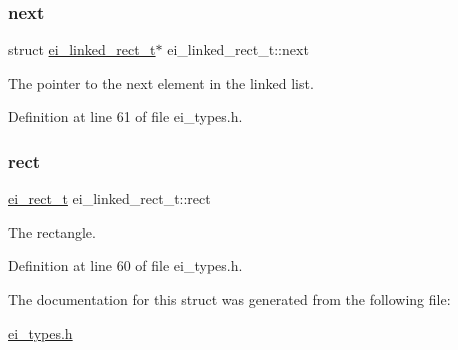\subsubsection{\texorpdfstring{next}{next}}
{\footnotesize\ttfamily struct \hyperlink{structei__linked__rect__t}{ei\+\_\+linked\+\_\+rect\+\_\+t}$\ast$ ei\+\_\+linked\+\_\+rect\+\_\+t\+::next}



The pointer to the next element in the linked list. 



Definition at line 61 of file ei\+\_\+types.\+h.

\mbox{\label{structei__linked__rect__t_ae7fa184a482756ca81a340de0775cc8b}} 
\subsubsection{\texorpdfstring{rect}{rect}}
{\footnotesize\ttfamily \hyperlink{structei__rect__t}{ei\+\_\+rect\+\_\+t} ei\+\_\+linked\+\_\+rect\+\_\+t\+::rect}



The rectangle. 



Definition at line 60 of file ei\+\_\+types.\+h.



The documentation for this struct was generated from the following file\+:\begin{DoxyCompactItemize}
\item 
\hyperlink{ei__types_8h}{ei\+\_\+types.\+h}\end{DoxyCompactItemize}
